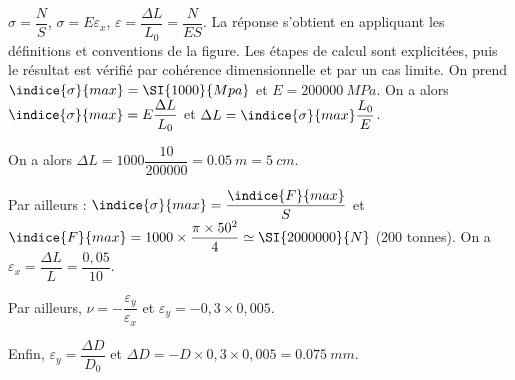 \begin{corrigebox}
$\sigma = \dfrac{N}{S}$, $\sigma = E\varepsilon_x$, $\varepsilon = \dfrac{\Delta L}{L_0} = \dfrac{N}{ES}$.
La réponse s'obtient en appliquant les définitions et conventions de la
    figure. Les étapes de calcul sont explicitées, puis le résultat est vérifié par
    cohérence dimensionnelle et par un cas limite.
On prend $\indice{\sigma}{max} = \SI{1000}{Mpa}$ et $E = \SI{200000}{MPa}$.
On a alors $\indice{\sigma}{max} = E \dfrac{\Delta L}{L_0}$ et $\Delta L =  \indice{\sigma}{max} \dfrac{L_0}{E}$.

On a alors $\Delta L =  1000 \dfrac{10}{200000} = \SI{0,05}{m} = \SI{5}{cm}$.

Par ailleurs : $\indice{\sigma}{max} = \dfrac{\indice{F}{max}}{S}$ et $\indice{F}{max} = 1000 \times \dfrac{\pi \times 50^2}{4} \simeq \SI{2 000 000}{N}$ (200 tonnes).
On a $\varepsilon_x = \dfrac{\Delta L}{L} = \dfrac{0,05}{10}$.

Par ailleurs, $\nu = -\dfrac{\varepsilon_y}{\varepsilon_x}$ et $\varepsilon_y = - 0,3 \times  0,005$.

Enfin, $\varepsilon_y = \dfrac{\Delta D}{D_0}$ et $\Delta D = -D  \times 0,3 \times  0,005=\SI{0,075}{mm}$.
\end{corrigebox}
